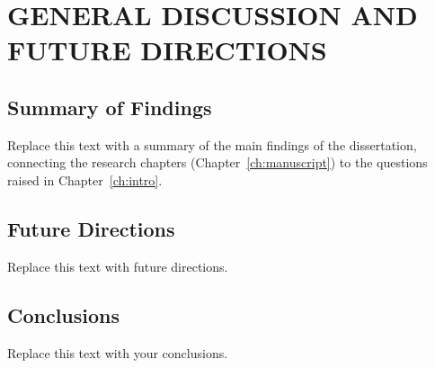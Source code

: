 \chapter{GENERAL DISCUSSION AND FUTURE DIRECTIONS}
\label{ch:discussion}

\section{Summary of Findings}

Replace this text with a summary of the main findings of the dissertation, connecting the research chapters (Chapter~\ref{ch:manuscript}) to the questions raised in Chapter~\ref{ch:intro}.

\section{Future Directions}

Replace this text with future directions.

\section{Conclusions}

Replace this text with your conclusions.
